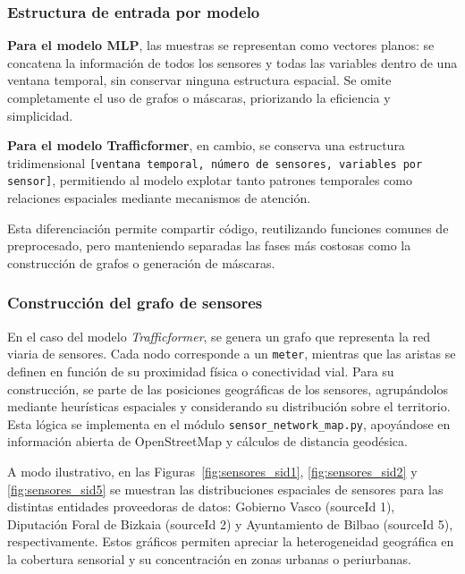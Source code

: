 \subsubsection*{Estructura de entrada por modelo}

\textbf{Para el modelo MLP}, las muestras se representan como vectores planos: se concatena la información de todos los sensores y todas las variables dentro de una ventana temporal, sin conservar ninguna estructura espacial. Se omite completamente el uso de grafos o máscaras, priorizando la eficiencia y simplicidad.

\textbf{Para el modelo Trafficformer}, en cambio, se conserva una estructura tridimensional \texttt{[ventana temporal, número de sensores, variables por sensor]}, permitiendo al modelo explotar tanto patrones temporales como relaciones espaciales mediante mecanismos de atención.

Esta diferenciación permite compartir código, reutilizando funciones comunes de preprocesado, pero manteniendo separadas las fases más costosas como la construcción de grafos o generación de máscaras.

\subsubsection*{Construcción del grafo de sensores}

En el caso del modelo \textit{Trafficformer}, se genera un grafo que representa la red viaria de sensores. Cada nodo corresponde a un \texttt{meter}, mientras que las aristas se definen en función de su proximidad física o conectividad vial. Para su construcción, se parte de las posiciones geográficas de los sensores, agrupándolos mediante heurísticas espaciales y considerando su distribución sobre el territorio. Esta lógica se implementa en el módulo \texttt{sensor\_network\_map.py}, apoyándose en información abierta de OpenStreetMap y cálculos de distancia geodésica.

A modo ilustrativo, en las Figuras~\ref{fig:sensores_sid1}, \ref{fig:sensores_sid2} y \ref{fig:sensores_sid5} se muestran las distribuciones espaciales de sensores para las distintas entidades proveedoras de datos: Gobierno Vasco (sourceId 1), Diputación Foral de Bizkaia (sourceId 2) y Ayuntamiento de Bilbao (sourceId 5), respectivamente. Estos gráficos permiten apreciar la heterogeneidad geográfica en la cobertura sensorial y su concentración en zonas urbanas o periurbanas.

